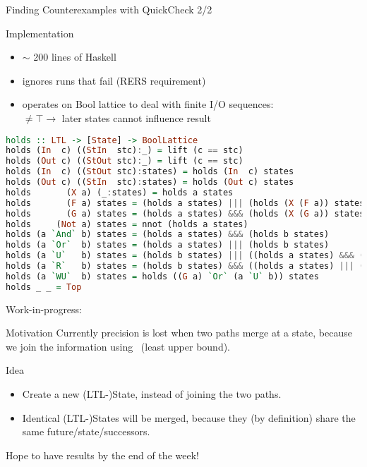 \begin{frame}[fragile]{Finding Counterexamples with QuickCheck 2/2}
  \begin{block}{Implementation}
    \begin{itemize}
    \item $\sim$ 200 lines of Haskell
    \item ignores runs that fail (RERS requirement)
    \item operates on Bool lattice to deal with finite I/O sequences:\\
      $\neq\top\rightarrow$ later states cannot influence result 
    \end{itemize}
  \end{block}

  \begin{lstlisting}[language=Haskell,basicstyle=\tiny]
holds :: LTL -> [State] -> BoolLattice
holds (In  c) ((StIn  stc):_) = lift (c == stc)
holds (Out c) ((StOut stc):_) = lift (c == stc)
holds (In  c) ((StOut stc):states) = holds (In  c) states
holds (Out c) ((StIn  stc):states) = holds (Out c) states
holds       (X a) (_:states) = holds a states
holds       (F a) states = (holds a states) ||| (holds (X (F a)) states)
holds       (G a) states = (holds a states) &&& (holds (X (G a)) states)
holds     (Not a) states = nnot (holds a states)
holds (a `And` b) states = (holds a states) &&& (holds b states)
holds (a `Or`  b) states = (holds a states) ||| (holds b states)
holds (a `U`   b) states = (holds b states) ||| ((holds a states) &&& (holds (X (a `U` b)) states))
holds (a `R`   b) states = (holds b states) &&& ((holds a states) ||| (holds (X (a `R` b)) states))
holds (a `WU`  b) states = holds ((G a) `Or` (a `U` b)) states
holds _ _ = Top
  \end{lstlisting}

\end{frame}

\begin{frame}{Work-in-progress:}
  \begin{block}{Motivation}
    Currently precision is lost when two paths merge at a state,
    because we join the information using \lub\ (least upper bound).
  \end{block}
  \begin{block}{Idea}
    \begin{itemize}
    \item Create a new (LTL-)State, instead of joining the two paths.
    \item Identical (LTL-)States will be merged, because they (by
      definition) share the same future/state/successors.
    \end{itemize} 
    Hope to have results by the end of the week!
  \end{block}
\end{frame}